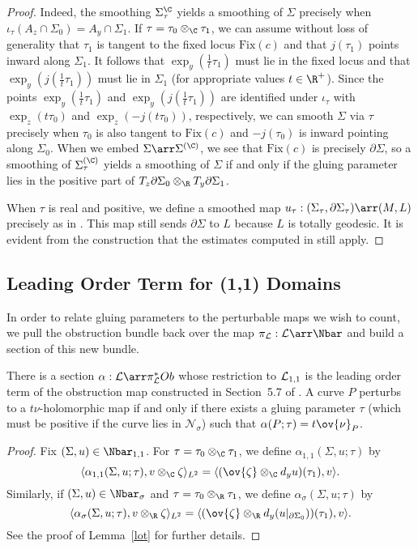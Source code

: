 \begin{lemma}
\begin{proof}
Indeed, the smoothing $\Sigma_\tau^{\C}$ yields a smoothing of $\Sigma$ precisely when $\iota_\tau(A_z \cap \Sigma_0)=A_y \cap \Sigma_1$. If $\tau=\tau_0 \otimes_\C \tau_1$, we can assume without loss of generality that $\tau_1$ is tangent to the fixed locus $\text{Fix}(c)$ and that $j(\tau_1)$ points inward along $\Sigma_1$. It follows that $\exp_y(\tfrac{1}{t}\tau_1)$ must lie in the fixed locus and that $\exp_y(j(\tfrac{1}{t}\tau_1))$ must lie in $\Sigma_1$ (for appropriate values $t \in \R^+$). Since the points $\exp_y(\tfrac{1}{t}\tau_1)$ and $\exp_y(j(\tfrac{1}{t}\tau_1))$ are identified under $\iota_\tau$ with $\exp_z(t\tau_0)$ and $\exp_z(-j(t\tau_0))$, respectively, we can smooth $\Sigma$ via $\tau$ precisely when $\tau_0$ is also tangent to $\text{Fix}(c)$ and $-j(\tau_0)$ is inward pointing along $\Sigma_0$. When we embed $\Sigma \arr \Sigma^{(\C)}$, we see that $\text{Fix}(c)$ is precisely $\partial\Sigma$, so a smoothing of $\Sigma_\tau^{(\C)}$ yields a smoothing of $\Sigma$ if and only if the gluing parameter lies in the positive part of $T_z\partial\Sigma_0 \otimes_\R T_y\partial\Sigma_1$.

When $\tau$ is real and positive, we define a smoothed map $u_\tau:(\Sigma_\tau,\partial\Sigma_\tau)\arr(M,L)$ precisely as in \cite{dw}. This map still sends $\partial\Sigma$ to $L$ because $L$ is totally geodesic. It is evident from the construction that the estimates computed in \cite{dw} still apply.
\end{proof}
\end{lemma}

\subsection{Leading Order Term for (1,1) Domains} \label{lot11ss}

In order to relate gluing parameters to the perturbable maps we wish to count, we pull the obstruction bundle back over the map $\pi_{\L}:\L\arr \Nbar$ and build a section of this new bundle.

\begin{lemma} \label{lot11}
There is a section $\alpha:\L \arr \pi_{\L}^*Ob$ whose restriction to $\mathcal{L}_{1,1}$ is the leading order term of the obstruction map constructed in Section~5.7 of \cite{dw}. A curve $P$ perturbs to a $t\nu$-holomorphic map if and only if there exists a gluing parameter $\tau$ (which must be positive if the curve lies in $\mathcal{N}_\sigma$) such that $\alpha(P;\tau)=t\ov{\nu}_P$.
\begin{proof}
Fix $(\Sigma,u) \in \Nbar_{1,1}$. For $\tau=\tau_0 \otimes_\C \tau_1$, we define $\alpha_{1,1}(\Sigma,u;\tau)$ by
\[
\langle \alpha_{1,1}(\Sigma,u;\tau),v \otimes_\C \zeta \rangle_{L^2} = \langle (\ov{\zeta} \otimes_\C d_yu)(\tau_1),v \rangle.
\]
Similarly, if $(\Sigma,u) \in \Nbar_\sigma$ and $\tau=\tau_0 \otimes_\R \tau_1$, we define $\alpha_\sigma(\Sigma,u;\tau)$ by
\[
\langle \alpha_\sigma(\Sigma,u;\tau),v \otimes_\R \zeta \rangle_{L^2} = \langle (\ov{\zeta} \otimes_\R d_y(u|_{\partial\Sigma_0}))(\tau_1),v \rangle.
\]
See the proof of Lemma~\ref{lot} for further details.
\end{proof}
\end{lemma}

